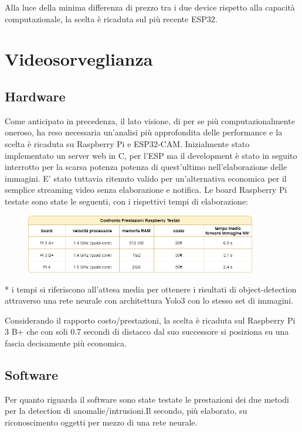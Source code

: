 Alla luce della minima differenza di prezzo tra i due device rispetto alla capacità computazionale, la scelta è ricaduta sul più recente ESP32.
\section{Videosorveglianza}
\subsection{Hardware}
Come anticipato in precedenza, il lato visione, di per se più computazionalmente oneroso, ha reso necessaria un'analisi più approfondita delle performance e la scelta è ricaduta su Raspberry Pi e ESP32-CAM. Inizialmente stato implementato un server web in C, per l'ESP ma il development è stato in seguito interrotto per la scarsa potenza potenza di quest'ultimo nell'elaborazione delle immagini. E' stato tuttavia ritenuto valido per un'alternativa economica per il semplice streaming video senza elaborazione e notifica.
Le board Raspberry Pi testate sono state le seguenti, con i rispettivi tempi di elaborazione:
    
    \begin{figure}[H]
        \centering
        \includegraphics[width=0.9\textwidth]{DrawIo/ConfrontoRaspberry.png}
    \end{figure}

* i tempi si riferiscono all'attesa media per ottenere i risultati di object-detection attraverso una rete neurale con architettura Yolo3 con lo stesso set di immagini.

Considerando il rapporto costo/prestazioni, la scelta è ricaduta sul Raspberry Pi 3 B+ che con soli 0.7 secondi di distacco dal suo successore si posiziona su una fascia decisamente più economica.


\subsection{Software}
Per quanto riguarda il software sono state testate le prestazioni dei due metodi per la detection di anomalie/intrusioni.Il secondo, più elaborato, su riconoscimento oggetti per mezzo di una rete neurale. 
